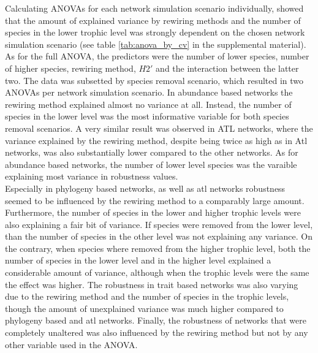 \documentclass[12pt,a4paper]{article}
\begin{document}
Calculating ANOVAs for each network simulation scenario individually, showed that the amount of explained variance by rewiring methods and the number of species in the lower trophic level was strongly dependent on the chosen network simulation scenario (see table \ref{tab:anova_by_cv} in the supplemental material). As for the full ANOVA, the predictors were the number of lower species, number of higher species, rewiring method, $H2'$ and the interaction between the latter two. The data was subsetted by species removal scenario, which resulted in two ANOVAs per network simulation scenario. In abundance based networks the rewiring method explained almost no variance at all. Instead, the number of species in the lower level was the most informative variable for both species removal scenarios. A very similar result was observed in ATL networks, where the variance explained by the rewiring method, despite being twice as high as in Atl networks, was also substantially lower compared to the other networks. As for abundance based networks, the number of lower level species was the varaible explaining most variance in robustness values. \\ Especially in phylogeny based networks, as well as atl networks robustness seemed to be influenced by the rewiring method to a comparably large amount. Furthermore, the number of species in the lower and higher trophic levels were also explaining a fair bit of variance. If species were removed from the lower level, than the number of species in the other level was not explaining any variance. On the contrary, when species where removed from the higher trophic level, both the number of species in the lower level and in the higher level explained a considerable amount of variance, although when the trophic levels were the same the effect was higher. The robustness in trait based networks was also varying due to the rewiring method and the number of species in the trophic levels, though the amount of unexplained variance was much higher compared to phylogeny based and atl networks. Finally, the robustness of networks that were completely unaltered was also influenced by the rewiring method but not by any other variable used in the ANOVA.
\end{document}
